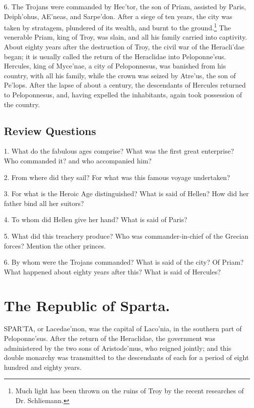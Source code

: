 \documentclass[openany,a4paper]{memoir}
\begin{document}
6. The Trojans were commanded by Hec'tor, the son of 
Priam, assisted by Paris, Deiph'ohus, AE'neas, and Sarpe'don. After a siege of ten years, the city was taken by 
stratagem, plundered of its wealth, and burnt to the ground.\footnote{Much light has been thrown on the ruins of Troy by the recent researches of Dr. Schliemann.} 
The venerable Priam, king of Troy, was slain, and all his 
family carried into captivity. About eighty years after the 
destruction of Troy, the civil war of the Heracli'dae began; 
it is usually called the return of the Heraclidae into Peloponne'sus. Hercules, king of Myce'nae, a city of Peloponnesus, 
was banished from his country, with all his family, while 
the crown was seized by Atre'us, the son of Pe'lops. After 
the lapse of about a century, the descendants of Hercules returned to Peloponnesus, and, having expelled the inhabitants, 
again took possession of the country. 



\section{Review Questions}



1. What do the fabulous ages comprise? What was the 
first great enterprise? Who commanded it? and who accompanied 
him? 

2. From where did they sail? For what was this famous voyage 
undertaken?

3. For what is the Heroic Age distinguished? What is 
said of Hellen? How did her father bind all her suitors? 

4. To whom did Hellen give her hand? What is said of Paris? 

5. What did this treachery produce? Who was commander-in-chief of 
the Grecian forces? Mention the other princes.

6. By whom were 
the Trojans commanded? What is said of the city? Of Priam? What 
happened about eighty years after this? What is said of Hercules? 



\chapter{The Republic of Sparta.} 

SPAR'TA, or Lacedae'mon, was the capital of Laco'nia, in the 
southern part of Peloponne'sus. After the return of the 
Heraclidae, the government was administered by the two sons 
of Aristode'mus, who reigned jointly; and this double monarchy was transmitted to the descendants of each for a period 
of eight hundred and eighty years. 
\end{document}
